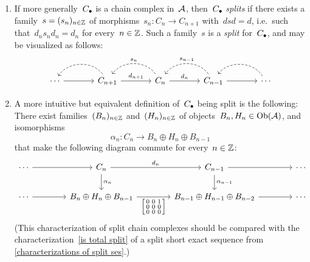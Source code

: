 \begin{remark*}
  \leavevmode
  \begin{enumerate}
    \item
      If more generally~$C_\bullet$ is a chain complex in~$\mathcal{A}$, then~$C_\bullet$ \emph{splits} if there exists a family~$s = (s_n)_{n \in \mathbb{Z}}$ of morphisms~$s_n \colon C_n \to C_{n+1}$ with~$dsd = d$, i.e.\ such that~$d_n s_n d_n = d_n$ for every~$n \in \mathbb{Z}$.
      Such a family~$s$ is a \emph{split} for~$C_\bullet$, and may be visualized as follows:
      \[
        \begin{tikzcd}[column sep = large]
            \dotsb
            \arrow{r}
          & C_{n+1}
            \arrow[dashed, bend right=55]{l}
            \arrow{r}[above]{d_{n+1}}
          & C_n
            \arrow[dashed, bend right=55]{l}[above]{s_n}
            \arrow{r}[above]{d_n}
          & C_{n-1}
            \arrow[dashed, bend right=55]{l}[above]{s_{n-1}}
            \arrow{r}
          & \dotsb
            \arrow[dashed, bend right=55]{l}
        \end{tikzcd}
      \]
    \item
      A more intuitive but equivalent definition of~$C_\bullet$ being split is the following:
      There exist families~$(B_n)_{n \in \mathbb{Z}}$ and~$(H_n)_{n \in \mathbb{Z}}$ of objects~$B_n, H_n \in \operatorname{Ob}(\mathcal{A})$, and isomorphisms
      \[
        \alpha_n
        \colon
        C_n
        \to
        B_n \oplus H_n \oplus B_{n-1}
      \]
      that make the following diagram commute for every~$n \in \mathbb{Z}$:
      \[
        \begin{tikzcd}[ampersand replacement = \&, column sep = 4em]
              \dotsb
              \arrow{r}
          \&  C_n
              \arrow{r}[above]{d_n}
              \arrow{d}[right]{\alpha_n}
          \&  C_{n-1}
              \arrow{r}
              \arrow{d}[right]{\alpha_{n-1}}
          \&  \dotsb
          \\
              \dotsb
              \arrow{r}
          \&  B_n \oplus H_n \oplus B_{n-1}
              \arrow{r}[below]{\begin{bsmallmatrix} 0 & 0 & 1 \\ 0 & 0 & 0 \\ 0 & 0 & 0 \end{bsmallmatrix}}
          \&  B_{n-1} \oplus H_{n-1} \oplus B_{n-2}
              \arrow{r}
          \&  \dotsb
        \end{tikzcd}
      \]
      (This characterization of split chain complexes should be compared with the characterization~\ref*{is total split} of a split short exact sequence from \cref{characterizations of split ses}.)

\end{enumerate}
\end{remark*}
